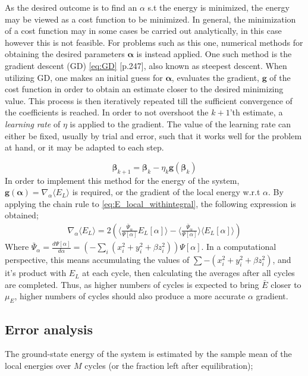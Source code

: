 \documentclass[%
oneside,                 %
final,                   %
10pt]{article}
\begin{document}
As the desired outcome is to find an $\alpha$ s.t the energy is minimized, the energy may be viewed as a cost function to be minimized.  In general, the minimization of a cost function may in some cases be carried out analytically, in this case however this is not feasible. For problems such as this one, numerical methods for obtaining the desired parameters $\bm \alpha$ is instead applied. One such method is the gradient descent (GD) \eqref{eq:GD} \citep{MLMurphy}[p.247], also known as steepest descent. When utilizing GD, one makes an initial guess for $\bm{\alpha}$, evaluates the gradient, $\bm g$ of the cost function in order to obtain an estimate closer to the desired minimizing value. This process is then iteratively repeated till the sufficient convergence of the coefficients is reached. In order to not overshoot the $k+1$'th estimate, a \textit{learning rate} of $\eta$ is applied to the gradient. The value of the learning rate can either be fixed, usually by trial and error, such that it works well for the problem at hand, or it may be adapted to each step. 

\begin{equation}
\bm{\beta}_{k+1}=\bm{\beta}_{k}-\eta_k  \bm g (\bm{\beta}_k)
\label{eq:GD}
\end{equation}
In order to implement this method for the energy of the system, $\bm g (\bm \alpha)=\nabla_{\alpha} \langle E_L \rangle$ is required, or the gradient of the local energy w.r.t $\alpha$. By applying the chain rule to \eqref{eq:E_local_withintegral}, the following expression is obtained;
\begin{align*}
\nabla_{\alpha} \langle E_L \rangle = 2 \left( \langle \frac{\bar \Psi_{\alpha}}{\Psi [\alpha]} E_L[\alpha] \rangle - \langle \frac{\bar \Psi_{\alpha}}{\Psi [\alpha]} \rangle \langle E_L[\alpha] \rangle  \right)
\end{align*}
Where $\bar \Psi_{\alpha} = \frac{d \Psi[\alpha]}{d \alpha} =  \left(- \sum_i (x_i^2 +y_i^2+\beta z_i^2) \right) \Psi[\alpha]$. In a computational perspective, this means accumulating the values of $\sum-( x_i^2 +y_i^2+\beta z_i^2)$, and it's product with $E_L$ at each cycle, then calculating the averages after all cycles are completed. Thus, as higher numbers of cycles is expected to bring $\bar{E}$ closer to $\mu_E$, higher numbers of cycles should also produce a more accurate $\alpha$ gradient.


\subsection{Error analysis} \label{importance_sampling}
The ground-state energy of the system is estimated by the sample mean of the local energies over $M$ cycles (or the fraction left after equilibration);
\end{document}
